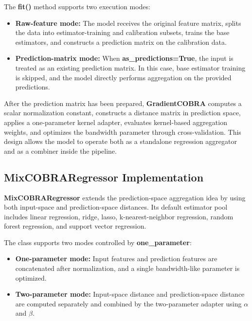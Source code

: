 The \textbf{fit()} method supports two execution modes:

\begin{itemize}
      \item \textbf{Raw-feature mode:} The model receives the original feature matrix, splits the data into estimator-training and calibration subsets, trains the base estimators, and constructs a prediction matrix on the calibration data.

      \item \textbf{Prediction-matrix mode:} When \textbf{as\_predictions=True}, the input is treated as an existing prediction matrix. In this case, base estimator training is skipped, and the model directly performs aggregation on the provided predictions.
\end{itemize}

After the prediction matrix has been prepared, \textbf{GradientCOBRA} computes a scalar normalization constant, constructs a distance matrix in prediction space, applies a one-parameter kernel adapter, evaluates kernel-based aggregation weights, and optimizes the bandwidth parameter through cross-validation. This design allows the model to operate both as a standalone regression aggregator and as a combiner inside the \KFCProcedure{} pipeline.


\subsection{MixCOBRARegressor Implementation}

\hs\textbf{MixCOBRARegressor} extends the prediction-space aggregation idea by using both input-space and prediction-space distances. Its default estimator pool includes linear regression, ridge, lasso, k-nearest-neighbor regression, random forest regression, and support vector regression.

The class supports two modes controlled by \textbf{one\_parameter}:

\begin{itemize}
      \item \textbf{One-parameter mode:} Input features and prediction features are concatenated after normalization, and a single bandwidth-like parameter is optimized.

      \item \textbf{Two-parameter mode:} Input-space distance and prediction-space distance are computed separately and combined by the two-parameter adapter using $\alpha$ and $\beta$.
\end{itemize}

